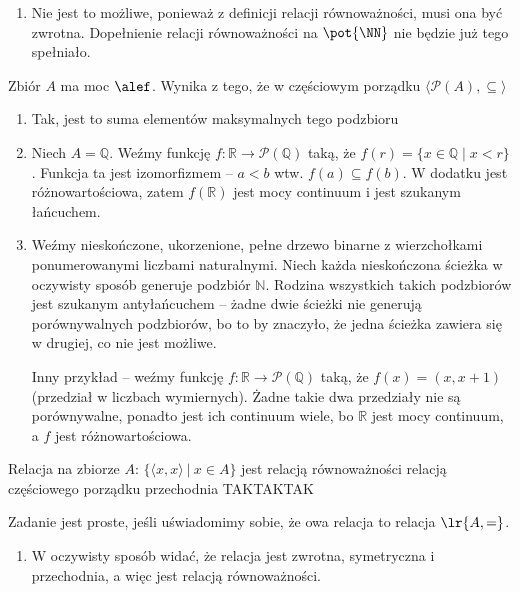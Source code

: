 \begin{solutions}
\begin{enumerate}[\bf A.]
        \item Nie jest to możliwe, ponieważ z definicji relacji równoważności, musi ona być zwrotna. Dopełnienie relacji równoważności na $\pot{\NN}$ nie będzie już tego spełniało.
    \end{enumerate}

    \sol Zbiór $A$ ma moc $\alef$. Wynika z tego, że w częściowym porządku $\langle\mathcal{P}(A),\subseteq\rangle$

    \begin{enumerate}[\bf A.]
        \item Tak, jest to suma elementów maksymalnych tego podzbioru

        \item Niech $A = \mathbb{Q}$. Weźmy funkcję $f : \mathbb{R} \to \mathcal{P}(\mathbb{Q})$ taką, że $f(r) = \{ x \in \mathbb{Q} \mid x < r \}$. Funkcja ta jest izomorfizmem -- $a < b$ wtw. $f(a) \subseteq f(b)$. W dodatku jest różnowartościowa, zatem $f(\mathbb{R})$ jest mocy continuum i jest szukanym łańcuchem.

        \item Weźmy nieskończone, ukorzenione, pełne drzewo binarne z wierzchołkami ponumerowanymi liczbami naturalnymi. Niech każda nieskończona ścieżka w oczywisty sposób generuje podzbiór $\mathbb{N}$. Rodzina wszystkich takich podzbiorów jest szukanym antyłańcuchem -- żadne dwie ścieżki nie generują porównywalnych podzbiorów, bo to by znaczyło, że jedna ścieżka zawiera się w drugiej, co nie jest możliwe.

        Inny przykład -- weźmy funkcję $f : \mathbb{R} \to \mathcal{P}(\mathbb{Q})$ taką, że $f(x) = (x, x+1)$ (przedział w liczbach wymiernych). Żadne takie dwa przedziały nie są porównywalne, ponadto jest ich continuum wiele, bo $\mathbb{R}$ jest mocy continuum, a $f$ jest różnowartościowa. 
    \end{enumerate}

    \sol Relacja na zbiorze $A$: $\{\langle x, x\rangle \ | \ x \in A\}$ jest
    \answerss
    {relacją równoważności}
    {relacją częściowego porządku}
    {przechodnia}
    {TAK}{TAK}{TAK}

    Zadanie jest proste, jeśli uświadomimy sobie, że owa relacja to relacja $\lr{A, =}$.
    \begin{enumerate}[\bf A.]
        \item W oczywisty sposób widać, że relacja jest zwrotna, symetryczna i przechodnia, a więc jest relacją równoważności.


\end{enumerate}
\end{solutions}
